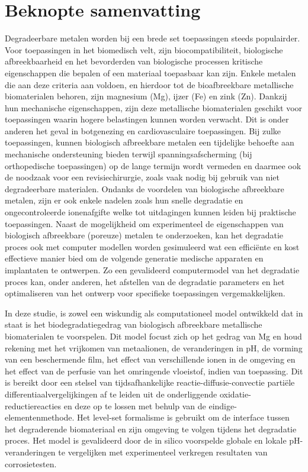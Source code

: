 \chapter{Beknopte samenvatting}

Degradeerbare metalen worden bij een brede set toepassingen steeds populairder. Voor toepassingen in het biomedisch velt, zijn biocompatibiliteit, biologische afbreekbaarheid en het bevorderden van biologische processen kritische eigenschappen die bepalen of een materiaal toepasbaar kan zijn. Enkele metalen die aan deze criteria aan voldoen, en hierdoor tot de bioafbreekbare metallische biomaterialen behoren, zijn magnesium (Mg), ijzer (Fe) en zink (Zn). Dankzij hun mechanische eigenschappen, zijn deze metallische biomaterialen geschikt voor toepassingen waarin hogere belastingen kunnen worden verwacht. Dit is onder anderen het geval in botgenezing en cardiovasculaire toepassingen. Bij zulke toepassingen, kunnen biologisch afbreekbare metalen een tijdelijke behoefte aan mechanische ondersteuning bieden terwijl spanningsafscherming (bij orthopedische toepassingen) op de lange termijn wordt vermeden en daarmee ook de noodzaak voor een revisiechirurgie, zoals vaak nodig bij gebruik van niet degradeerbare materialen. Ondanks de voordelen van biologische afbreekbare metalen, zijn er ook enkele nadelen zoals hun snelle degradatie en ongecontroleerde ionenafgifte welke tot uitdagingen kunnen leiden bij praktische toepassingen. Naast de mogelijkheid om experimenteel de eigenschappen van biologisch afbreekbare (poreuze) metalen te onderzoeken, kan het degradatie proces ook met computer modellen worden gesimuleerd wat een efficiënte en kost effectieve manier bied om de volgende generatie medische apparaten en implantaten te ontwerpen. Zo een gevalideerd computermodel van het degradatie proces kan, onder anderen, het afstellen van de degradatie parameters en het optimaliseren van het ontwerp voor specifieke toepassingen vergemakkelijken.

In deze studie, is zowel een wiskundig als computationeel model ontwikkeld dat in staat is het biodegradatiegedrag van biologisch afbreekbare metallische biomaterialen te voorspelen. Dit model focust zich op het gedrag van Mg en houd rekening met het vrijkomen van metaalionen, de veranderingen in pH, de vorming van een beschermende film, het effect van verschillende ionen in de omgeving en het effect van de perfusie van het omringende vloeistof, indien van toepassing. Dit is bereikt door een stelsel van tijdsafhankelijke reactie-diffusie-convectie partiële differentiaalvergelijkingen af te leiden uit de onderliggende oxidatie-reductiereacties en deze op te lossen met behulp van de eindige-elementenmethode. Het level-set formalisme is gebruikt om de interface tussen het degraderende biomateriaal en zijn omgeving te volgen tijdens het degradatie proces. Het model is gevalideerd door de in silico voorspelde globale en lokale pH-veranderingen te vergelijken met experimenteel verkregen resultaten van corrosietesten.

